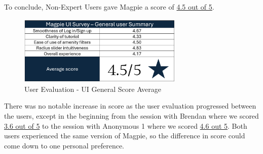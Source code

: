 \newpage{}

To conclude, Non-Expert Users gave Magpie a score of \underline{4.5 out of 5}.
\begin{figure}[h!]
    \centering
    \includegraphics[width=0.7\textwidth]{images/survey-casual-summary.png}
    \caption{User Evaluation - UI General Score Average}
\end{figure}
There was no notable increase in score as the user evaluation progressed between
the users, except in the beginning from the session with Brendan where we scored
\underline{3.6 out of 5} to the session with Anonymous 1 where we scored
\underline{4.6 out 5}. Both users experienced the same version of Magpie, so the
difference in score could come down to one personal preference.